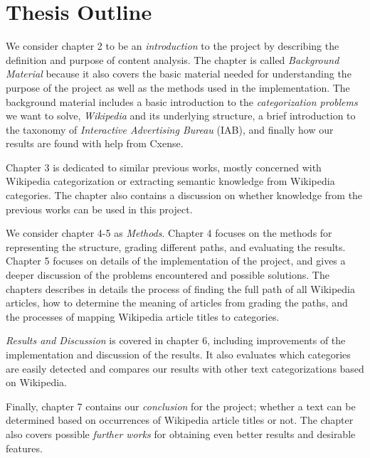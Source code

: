 \section{Thesis Outline}
We consider chapter 2 to be an \emph{introduction} to the project by describing the definition and purpose of content analysis. The chapter is called \emph{Background Material} because it also covers the basic material needed for understanding the purpose of the project as well as the methods used in the implementation. The background material includes a basic introduction to the \emph{categorization problems} we want to solve, \emph{Wikipedia} and its underlying structure, a brief introduction to the taxonomy of \emph{Interactive Advertising Bureau} (IAB), and finally how our results are found with help from Cxense.

Chapter 3 is dedicated to similar previous works, mostly concerned with Wikipedia categorization or extracting semantic knowledge from Wikipedia categories. The chapter also contains a discussion on whether knowledge from the previous works can be used in this project. 

We consider chapter 4-5 as \emph{Methods}. Chapter 4 focuses on the methods for representing the structure, grading different paths, and evaluating the results. Chapter 5 focuses on details of the implementation of the project, and gives a deeper discussion of the problems encountered and possible solutions. The chapters describes in details the process of finding the full path of all Wikipedia articles, how to determine the meaning of articles from grading the paths, and the processes of mapping Wikipedia article titles to categories.

\emph{Results and Discussion} is covered in chapter 6, including improvements of the implementation and discussion of the results. It also evaluates which categories are easily detected and compares our results with other text categorizations based on Wikipedia.

Finally, chapter 7 contains our \emph{conclusion} for the project; whether a text can be determined based on occurrences of Wikipedia article titles or not. The chapter also covers possible \emph{further works} for obtaining even  better results and desirable features. 


